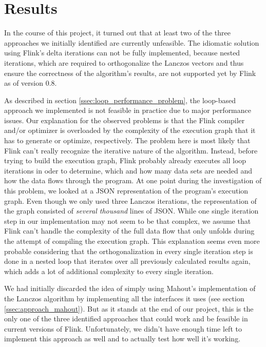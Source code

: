 \section{Results}
\label{sec:results}

In the course of this project, it turned out that at least two of the three
approaches we initially identified are currently unfeasible. The idiomatic
solution using Flink's delta iterations can not be fully implemented, because
nested iterations, which are required to orthogonalize the Lanczos vectors and
thus ensure the correctness of the algorithm's results, are not supported yet
by Flink as of version 0.8.

As described in section \ref{ssec:loop_performance_problem}, the loop-based
approach we implemented is not feasible in practice due to major performance
issues. Our explanation for the observed problems is that the Flink compiler
and/or optimizer is overloaded by the complexity of the execution graph that it
has to generate or optimize, respectively. The problem here is most likely that
Flink can't really recognize the iterative nature of the algorithm. Instead,
before trying to build the execution graph, Flink probably already executes all
loop iterations in oder to determine, which and how many data sets are needed
and how the data flows through the program. At one point during the
investigation of this problem, we looked at a JSON representation of the
program's execution graph. Even though we only used three Lanczos iterations,
the representation of the graph consisted of \textit{several thousand} lines
of JSON. While one single iteration step in our implementation may not seem to
be that complex, we assume that Flink can't handle the complexity of the full
data flow that only unfolds during the attempt of compiling the execution
graph. This explanation seems even more probable considering that the
orthogonalization in every single iteration step is done in a nested loop that
iterates over all previously calculated results again, which adds a lot of
additional complexity to every single iteration.

We had initially discarded the idea of simply using Mahout's implementation of
the Lanczos algorithm by implementing all the interfaces it uses (see section
\ref{ssec:approach_mahout}). But as it stands at the end of our project, this
is the only one of the three identified approaches that could work and be
feasible in current versions of Flink. Unfortunately, we didn't have enough
time left to implement this approach as well and to actually test how well it's
working.
